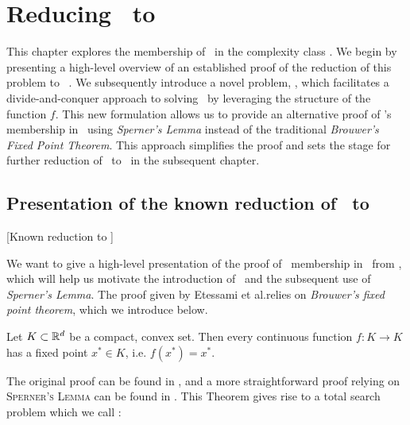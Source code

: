 \setchapterpreamble[u]{\margintoc}
\chapter{Reducing \Tarski\ to \PPAD}
\label{ch:ppad_reduction}

This chapter explores the membership of \Tarski\ in the complexity class \PPAD. We begin by presenting a high-level overview of an established proof of the reduction of this problem to \Brouwer~. We subsequently introduce a novel problem, \Tarskistar, which facilitates a divide-and-conquer approach to solving \Tarski\ by leveraging the structure of the function $f$. This new formulation allows us to provide an alternative proof of \Tarski's membership in \PPAD\ using \textit{Sperner's Lemma} instead of the traditional \textit{Brouwer's Fixed Point Theorem}. This approach simplifies the proof and sets the stage for further reduction of \Tarskistar\ to \EOPL\ in the subsequent chapter.

\section{Presentation of the known reduction of \Tarski\ to \PPAD}[Known reduction to \PPAD]

We want to give a high-level presentation of the proof of \Tarski\ membership in \PPAD\ from , which will help us motivate the introduction of \Tarskistar\ and the subsequent use of \textit{Sperner's Lemma}. The proof given by Etessami et al.\@ relies on \textit{Brouwer's fixed point theorem}, which we introduce below.

\begin{theorem}
	Let $K \subset \mathbb{R}^d$ be a compact, convex set. Then every continuous function $f : K \rightarrow K$ has a fixed point $x^*  \in K$, i.e. $f(x^*) = x^*$.
\end{theorem}

The original proof can be found in , and a more straightforward proof relying on \textsc{Sperner's Lemma} can be found in . This Theorem gives rise to a total search problem which we call \Brouwer:


